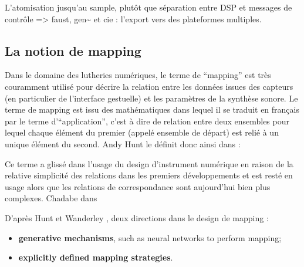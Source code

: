 
L’atomisation jusqu’au sample, plutôt que séparation entre DSP et messages de contrôle
=> faust, gen\textasciitilde{ } et cie : l’export vers des plateformes multiples.

\subsection{La notion de mapping}

\noindent Dans le domaine des lutheries numériques, le terme de ``mapping'' est très couramment utilisé pour décrire la relation entre les données issues des capteurs (en particulier de l'interface gestuelle) et les paramètres de la synthèse sonore. 
Le terme de mapping est issu des mathématiques dans lequel il se traduit en français par le terme d'``application'', c'est à dire de relation entre deux ensembles pour lequel chaque élément du premier (appelé ensemble de départ) est relié à un unique élément du second. Andy Hunt le définit donc ainsi dans \cite{hunt_mapping_2002}: 

\indent Ce terme a glissé dans l'usage du design d'instrument numérique en raison de la relative simplicité des relations dans les premiers développements et est resté en usage alors que les relations de correspondance sont aujourd'hui bien plus complexes.
 Chadabe dans \cite{chadabe_limitations_2002}

 \cite{hunt_towards_2000}

D'après Hunt et Wanderley \cite{hunt_mapping_2002}, deux directions dans le design de mapping :
\vspace{-1em}
\begin{itemize}[noitemsep]
	\item \textbf{generative mechanisms}, such as neural networks to perform mapping;
	\item \textbf{explicitly defined mapping strategies}.
\end{itemize}

